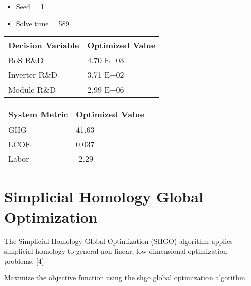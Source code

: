 \documentclass[letterpaper,10pt,english]{sphinxmanual}
\begin{document}
\begin{itemize}
\item {} 
Seed = 1

\item {} 
Solve time = 589

\end{itemize}


\begin{savenotes}\sphinxattablestart
\centering
\begin{tabulary}{\linewidth}[t]{|T|T|}
\hline
\sphinxstyletheadfamily 
Decision Variable
&\sphinxstyletheadfamily 
Optimized Value
\\
\hline
BoS R\&D
&
4.70 E+03
\\
\hline
Inverter R\&D
&
3.71 E+02
\\
\hline
Module R\&D
&
2.99 E+06
\\
\hline
\end{tabulary}
\par
\sphinxattableend\end{savenotes}


\begin{savenotes}\sphinxattablestart
\centering
\begin{tabulary}{\linewidth}[t]{|T|T|}
\hline
\sphinxstyletheadfamily 
System Metric
&\sphinxstyletheadfamily 
Optimized Value
\\
\hline
GHG
&
41.63
\\
\hline
LCOE
&
0.037
\\
\hline
Labor
&
-2.29
\\
\hline
\end{tabulary}
\par
\sphinxattableend\end{savenotes}


\section{Simplicial Homology Global Optimization}
\label{\detokenize{optimizers:simplicial-homology-global-optimization}}
The Simplicial Homology Global Optimization (SHGO) algorithm applies
simplicial homology to general non-linear, low-dimensional optimization
problems. {[}4{]}


Maximize the objective function using the shgo global optimization
algorithm.
\end{document}
